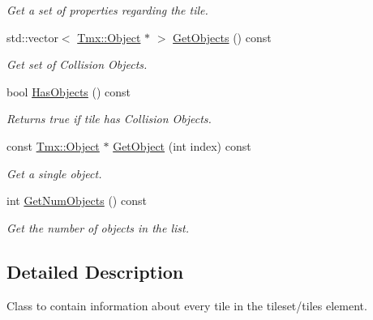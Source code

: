 \begin{DoxyCompactItemize}
\begin{DoxyCompactList}\small\item\em Get a set of properties regarding the tile. \end{DoxyCompactList}\item 
\hypertarget{classTmx_1_1Tile_a8b0aee9d016fbb3c912b0ac7153a2333}{std\-::vector$<$ \hyperlink{classTmx_1_1Object}{Tmx\-::\-Object} $\ast$ $>$ \hyperlink{classTmx_1_1Tile_a8b0aee9d016fbb3c912b0ac7153a2333}{Get\-Objects} () const }\label{classTmx_1_1Tile_a8b0aee9d016fbb3c912b0ac7153a2333}

\begin{DoxyCompactList}\small\item\em Get set of Collision Objects. \end{DoxyCompactList}\item 
\hypertarget{classTmx_1_1Tile_a31a59f592e9a2ec96b57aa77eca98bf3}{bool \hyperlink{classTmx_1_1Tile_a31a59f592e9a2ec96b57aa77eca98bf3}{Has\-Objects} () const }\label{classTmx_1_1Tile_a31a59f592e9a2ec96b57aa77eca98bf3}

\begin{DoxyCompactList}\small\item\em Returns true if tile has Collision Objects. \end{DoxyCompactList}\item 
\hypertarget{classTmx_1_1Tile_a4086d0b8b91fa9e27c3d3f710c7ad50e}{const \hyperlink{classTmx_1_1Object}{Tmx\-::\-Object} $\ast$ \hyperlink{classTmx_1_1Tile_a4086d0b8b91fa9e27c3d3f710c7ad50e}{Get\-Object} (int index) const }\label{classTmx_1_1Tile_a4086d0b8b91fa9e27c3d3f710c7ad50e}

\begin{DoxyCompactList}\small\item\em Get a single object. \end{DoxyCompactList}\item 
\hypertarget{classTmx_1_1Tile_add455b756c2ed715c03aada301d9e5c9}{int \hyperlink{classTmx_1_1Tile_add455b756c2ed715c03aada301d9e5c9}{Get\-Num\-Objects} () const }\label{classTmx_1_1Tile_add455b756c2ed715c03aada301d9e5c9}

\begin{DoxyCompactList}\small\item\em Get the number of objects in the list. \end{DoxyCompactList}\end{DoxyCompactItemize}


\subsection{Detailed Description}
Class to contain information about every tile in the tileset/tiles element. 

